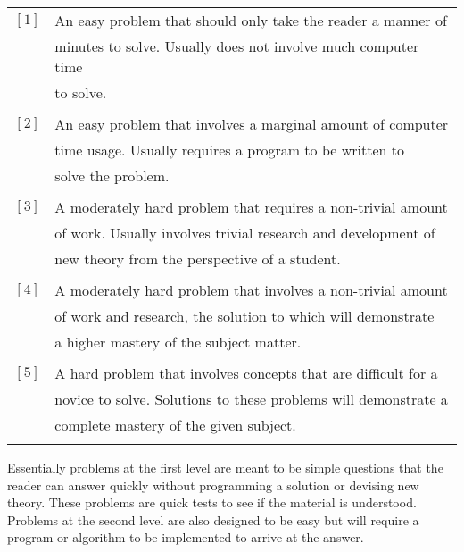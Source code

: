 \documentclass[b5paper]{book}
\begin{document}
\begin{tabular}{cl}
$\left [ 1 \right ]$ & An easy problem that should only take the reader a manner of \\
                     & minutes to solve.  Usually does not involve much computer time \\
                     & to solve. \\
                     & \\
$\left [ 2 \right ]$ & An easy problem that involves a marginal amount of computer \\
                     & time usage.  Usually requires a program to be written to \\
                     & solve the problem. \\
                     & \\
$\left [ 3 \right ]$ & A moderately hard problem that requires a non-trivial amount \\
                     & of work.  Usually involves trivial research and development of \\
                     & new theory from the perspective of a student. \\
                     & \\
$\left [ 4 \right ]$ & A moderately hard problem that involves a non-trivial amount \\
                     & of work and research, the solution to which will demonstrate \\
                     & a higher mastery of the subject matter. \\
                     & \\
$\left [ 5 \right ]$ & A hard problem that involves concepts that are difficult for a \\
                     & novice to solve.  Solutions to these problems will demonstrate a \\
                     & complete mastery of the given subject. \\
                     & \\
\end{tabular}

Essentially problems at the first level are meant to be simple questions that the reader can answer quickly without programming a solution or
devising new theory.  These problems are quick tests to see if the material is understood.  Problems at the second level are also
designed to be easy but will require a program or algorithm to be implemented to arrive at the answer.  
\end{document}
